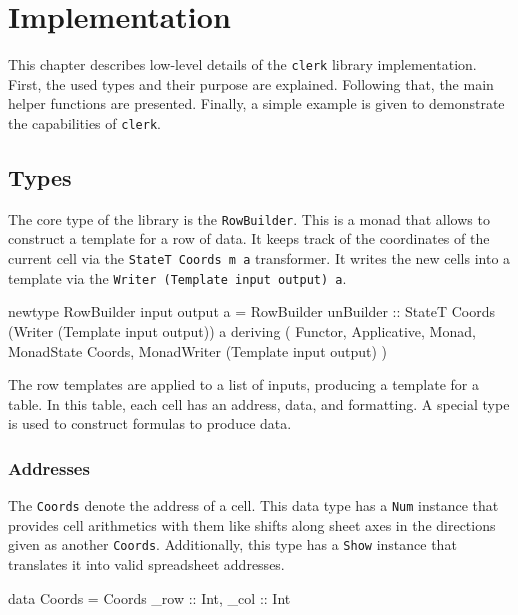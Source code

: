 
\chapter{Implementation}
\label{chap:impl}

This chapter describes low-level details of the \texttt{clerk} library implementation. First, the used types and their purpose are explained. Following that, the main helper functions are presented. Finally, a simple example is given to demonstrate the capabilities of \texttt{clerk}.

\section{Types}
\label{sec:types}

The core type of the library is the \texttt{RowBuilder}. This is a monad that allows to construct a template for a row of data. It keeps track of the coordinates of the current cell via the \texttt{StateT Coords m a} transformer. It writes the new cells into a template via the \texttt{Writer (Template input output) a}.

\begin {mycode}
newtype RowBuilder input output a = RowBuilder
  { unBuilder :: StateT Coords (Writer (Template input output)) a
  }
  deriving (
    Functor,  Applicative,  Monad,  MonadState Coords,
    MonadWriter (Template input output)
  )
\end{mycode}

The row templates are applied to a list of inputs, producing a template for a table.
In this table, each cell has an address, data, and formatting. A special type is used to construct formulas to produce data.

\subsection{Addresses}
\label{sec:addresses}

The \texttt{Coords} denote the address of a cell. This data type has a \texttt{Num} instance that provides cell arithmetics with them like shifts along sheet axes in the directions given as another \texttt{Coords}. Additionally, this type has a \texttt{Show} instance that translates it into valid spreadsheet addresses.

\begin{mycode}
data Coords = Coords {_row :: Int, _col :: Int}
\end{mycode}

